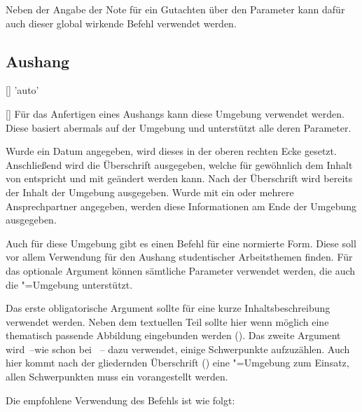 \begin{Declaration*}{}
\begin{Declaration}{}
\printdeclarationlist%
%
Neben der Angabe der Note für ein Gutachten über den Parameter 
 kann dafür auch dieser global wirkende 
Befehl verwendet werden.
\end{Declaration}


\subsection{Aushang}
\begin{Declaration}{[]}{%
  'auto'%
}
\begin{Declaration}{[]}
\printdeclarationlist%
%
%
Für das Anfertigen eines Aushangs kann diese Umgebung verwendet werden. Diese 
basiert abermals auf der Umgebung  und unterstützt alle 
deren Parameter.

Wurde ein Datum angegeben, wird dieses in der oberen rechten Ecke gesetzt. 
Anschließend wird die Überschrift ausgegeben, welche für gewöhnlich dem Inhalt 
von  entspricht und mit  
geändert werden kann. Nach der Überschrift wird bereits der Inhalt der Umgebung 
ausgegeben. Wurde mit  ein oder mehrere Ansprechpartner 
angegeben, werden diese Informationen am Ende der Umgebung ausgegeben.
\end{Declaration}
\end{Declaration}

\begin{Declaration}{\LParameter%
}
\printdeclarationlist%
%
Auch für diese Umgebung gibt es einen Befehl für eine normierte Form. Diese 
soll vor allem Verwendung für den Aushang studentischer Arbeitsthemen finden. 
Für das optionale Argument können sämtliche Parameter verwendet werden, die 
auch die "=Umgebung unterstützt.

Das erste obligatorische Argument sollte für eine kurze Inhaltsbeschreibung 
verwendet werden. Neben dem textuellen Teil sollte hier wenn möglich eine 
thematisch passende Abbildung eingebunden werden (). Das 
zweite Argument wird~--wie schon bei ~-- dazu verwendet, einige 
Schwerpunkte aufzuzählen. Auch hier kommt nach der gliedernden Überschrift 
() eine "=Umgebung zum Einsatz, allen 
Schwerpunkten muss ein  vorangestellt werden.
%
\end{Declaration}
%
\begin{Example}
Die empfohlene Verwendung des Befehls  ist wie folgt:
\begin{Code}[escapechar=§]
\end{Code}
\end{Example}
\end{Declaration*}
